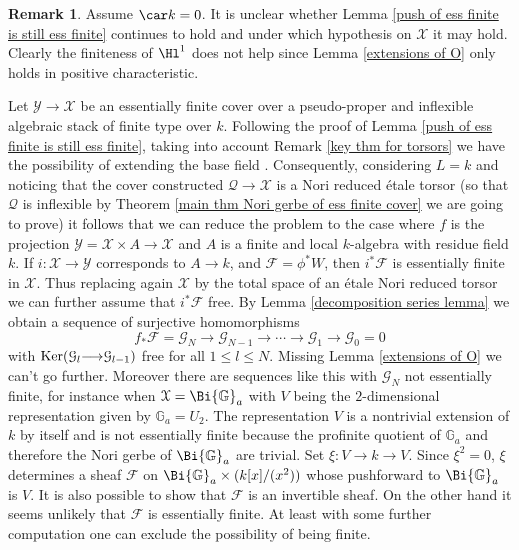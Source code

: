 \documentclass[12pt,reqno]{amsart}
\theoremstyle{plain}
\theoremstyle{definition}
\newtheorem{rmk}[thm]{Remark}
\numberwithin{thm}{section}
\newcounter{x}\setcounter{x}{1}
\theoremstyle{plain}
\begin{document}
\begin{rmk}
Assume $\car k = 0$. It is unclear whether Lemma
\ref{push of ess finite is still ess finite} continues to hold and under which
hypothesis on ${\mathcal{X}}$ it may hold. Clearly the finiteness of $\Hl^1$ does not help
since Lemma \ref{extensions of O} only holds in positive characteristic.

Let ${\mathcal{Y}}{\longrightarrow} {\mathcal{X}}$ be an essentially finite cover over a pseudo-proper and
inflexible algebraic stack of finite type over $k$. Following the proof of
Lemma \ref{push of ess finite is still ess finite}, taking into account
Remark \ref{key thm for torsors} we have the possibility of extending
the base field \cite[Proposition 6.1]{BV}. Consequently, considering $L=k$ and noticing
that the cover constructed ${\mathcal{Q}}{\longrightarrow} {\mathcal{X}}$ is a Nori reduced \'etale torsor
(so that ${\mathcal{Q}}$ is inflexible by
Theorem \ref{main thm Nori gerbe of ess finite cover} we are going to prove) it follows
that we can reduce the problem to the case where $f$ is the projection
${\mathcal{Y}}={\mathcal{X}}\times A {\longrightarrow} {\mathcal{X}}$ and $A$ is a finite and local $k$-algebra with
residue field $k$. If $i\colon {\mathcal{X}}{\longrightarrow} {\mathcal{Y}}$ corresponds to $A{\longrightarrow} k$, and ${\mathcal{F}}
=\phi^*W$, then $i^*{\mathcal{F}}$ is essentially finite in ${\mathcal{X}}$. Thus replacing again ${\mathcal{X}}$ by the total space of an \'etale Nori reduced torsor we can further assume
that $i^*{\mathcal{F}}$ free. By Lemma \ref{decomposition series lemma} we obtain a sequence of surjective
homomorphisms
\[
f_*{\mathcal{F}} = {\mathcal{G}}_N {\longrightarrow} {\mathcal{G}}_{N-1} {\longrightarrow} \cdots {\longrightarrow} {\mathcal{G}}_1 {\longrightarrow} {\mathcal{G}}_0 = 0
\]
with ${{\rm Ker}}({\mathcal{G}}_{l}{\longrightarrow} {\mathcal{G}}_{l-1})$ free for all $1\leq l \leq N$. Missing
Lemma \ref{extensions of O} we can't go further. Moreover there are sequences like this with ${\mathcal{G}}_N$ not essentially finite, for instance when ${\mathcal{X}}=\Bi {{\mathbb G}}_a$
with $V$ being the $2$-dimensional representation given by ${{\mathbb G}}_a=U_2$. The
representation $V$ is a nontrivial extension of $k$ by itself and is not essentially
finite because the profinite quotient of ${{\mathbb G}}_a$ and therefore the Nori gerbe of
$\Bi{{\mathbb G}}_a$ are trivial. Set $\xi\colon V{\longrightarrow} k {\longrightarrow} V$. Since $\xi^2=0$, $\xi$ determines
a sheaf ${\mathcal{F}}$ on $\Bi{{\mathbb G}}_a \times (k[x]/(x^2))$ whose pushforward to $\Bi {{\mathbb G}}_a$ is
$V$. It is also possible to show that ${\mathcal{F}}$ is an invertible sheaf. On the other hand
it seems unlikely that ${\mathcal{F}}$ is essentially finite. At least with some further
computation one can exclude the possibility of being finite.
\end{rmk}
\end{document}
